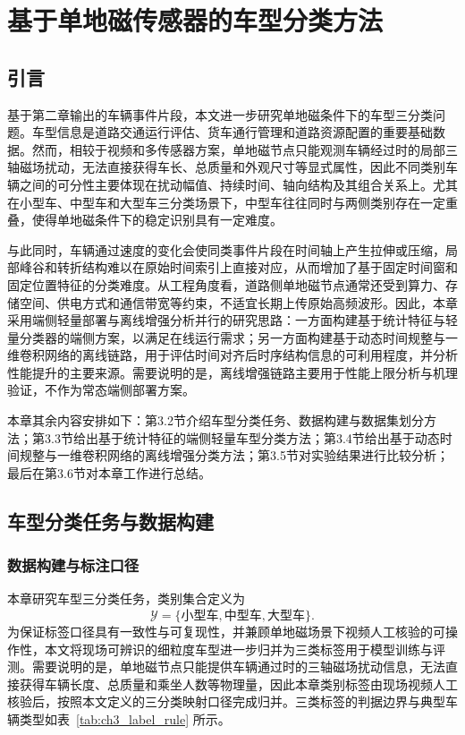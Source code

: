 \chapter{基于单地磁传感器的车型分类方法}
\label{ch:veh_cls}

\section{引言}
\label{sec:ch3_intro}

基于第二章输出的车辆事件片段，本文进一步研究单地磁条件下的车型三分类问题。车型信息是道路交通运行评估、货车通行管理和道路资源配置的重要基础数据。然而，相较于视频和多传感器方案，单地磁节点只能观测车辆经过时的局部三轴磁场扰动，无法直接获得车长、总质量和外观尺寸等显式属性，因此不同类别车辆之间的可分性主要体现在扰动幅值、持续时间、轴向结构及其组合关系上。尤其在小型车、中型车和大型车三分类场景下，中型车往往同时与两侧类别存在一定重叠，使得单地磁条件下的稳定识别具有一定难度。

与此同时，车辆通过速度的变化会使同类事件片段在时间轴上产生拉伸或压缩，局部峰谷和转折结构难以在原始时间索引上直接对应，从而增加了基于固定时间窗和固定位置特征的分类难度。从工程角度看，道路侧单地磁节点通常还受到算力、存储空间、供电方式和通信带宽等约束，不适宜长期上传原始高频波形。因此，本章采用端侧轻量部署与离线增强分析并行的研究思路：一方面构建基于统计特征与轻量分类器的端侧方案，以满足在线运行需求；另一方面构建基于动态时间规整与一维卷积网络的离线链路，用于评估时间对齐后时序结构信息的可利用程度，并分析性能提升的主要来源。需要说明的是，离线增强链路主要用于性能上限分析与机理验证，不作为常态端侧部署方案。

本章其余内容安排如下：第3.2节介绍车型分类任务、数据构建与数据集划分方法；第3.3节给出基于统计特征的端侧轻量车型分类方法；第3.4节给出基于动态时间规整与一维卷积网络的离线增强分类方法；第3.5节对实验结果进行比较分析；最后在第3.6节对本章工作进行总结。

\section{车型分类任务与数据构建}
\label{sec:ch3_task_data}

\subsection{数据构建与标注口径}
\label{subsec:ch3_data_build}

本章研究车型三分类任务，类别集合定义为
\begin{equation}
    \mathcal{Y}=\{\text{小型车},\text{中型车},\text{大型车}\}.
\end{equation}
为保证标签口径具有一致性与可复现性，并兼顾单地磁场景下视频人工核验的可操作性，本文将现场可辨识的细粒度车型进一步归并为三类标签用于模型训练与评测。需要说明的是，单地磁节点只能提供车辆通过时的三轴磁场扰动信息，无法直接获得车辆长度、总质量和乘坐人数等物理量，因此本章类别标签由现场视频人工核验后，按照本文定义的三分类映射口径完成归并。三类标签的判据边界与典型车辆类型如表~\ref{tab:ch3_label_rule} 所示。

